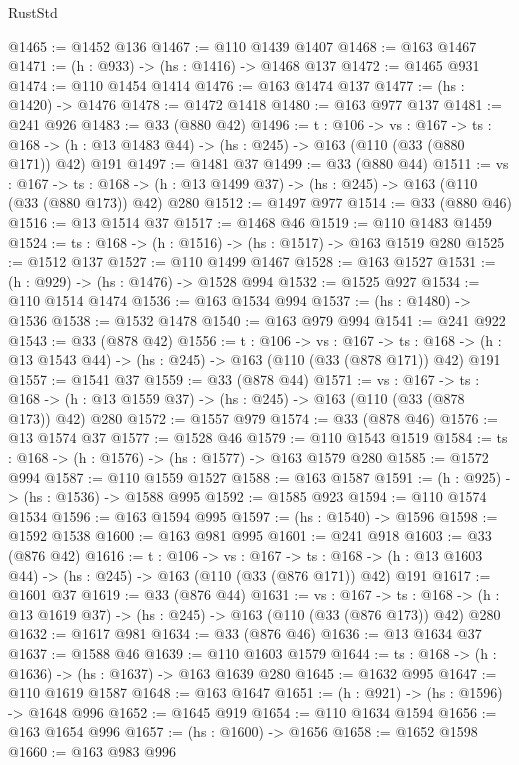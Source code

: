 \begin{lexlean}{RustStd}
\begin{coremodule}
{\begin{coremodule}
{{{{{@1465 := @1452 @136
@1467 := @110 @1439 @1407
@1468 := @163 @1467
@1471 := (h : @933) -> (hs : @1416) -> @1468 @137
@1472 := @1465 @931
@1474 := @110 @1454 @1414
@1476 := @163 @1474 @137
@1477 := (hs : @1420) -> @1476
@1478 := @1472 @1418
@1480 := @163 @977 @137
@1481 := @241 @926
@1483 := @33 (@880 @42)
@1496 := {t : @106} ->
  {vs : @167} ->
  {ts : @168} -> (h : @13 @1483 @44) -> (hs : @245) -> @163 (@110 (@33 (@880 @171)) @42) @191
@1497 := @1481 @37
@1499 := @33 (@880 @44)
@1511 := {vs : @167} ->
  {ts : @168} -> (h : @13 @1499 @37) -> (hs : @245) -> @163 (@110 (@33 (@880 @173)) @42) @280
@1512 := @1497 @977
@1514 := @33 (@880 @46)
@1516 := @13 @1514 @37
@1517 := @1468 @46
@1519 := @110 @1483 @1459
@1524 := {ts : @168} -> (h : @1516) -> (hs : @1517) -> @163 @1519 @280
@1525 := @1512 @137
@1527 := @110 @1499 @1467
@1528 := @163 @1527
@1531 := (h : @929) -> (hs : @1476) -> @1528 @994
@1532 := @1525 @927
@1534 := @110 @1514 @1474
@1536 := @163 @1534 @994
@1537 := (hs : @1480) -> @1536
@1538 := @1532 @1478
@1540 := @163 @979 @994
@1541 := @241 @922
@1543 := @33 (@878 @42)
@1556 := {t : @106} ->
  {vs : @167} ->
  {ts : @168} -> (h : @13 @1543 @44) -> (hs : @245) -> @163 (@110 (@33 (@878 @171)) @42) @191
@1557 := @1541 @37
@1559 := @33 (@878 @44)
@1571 := {vs : @167} ->
  {ts : @168} -> (h : @13 @1559 @37) -> (hs : @245) -> @163 (@110 (@33 (@878 @173)) @42) @280
@1572 := @1557 @979
@1574 := @33 (@878 @46)
@1576 := @13 @1574 @37
@1577 := @1528 @46
@1579 := @110 @1543 @1519
@1584 := {ts : @168} -> (h : @1576) -> (hs : @1577) -> @163 @1579 @280
@1585 := @1572 @994
@1587 := @110 @1559 @1527
@1588 := @163 @1587
@1591 := (h : @925) -> (hs : @1536) -> @1588 @995
@1592 := @1585 @923
@1594 := @110 @1574 @1534
@1596 := @163 @1594 @995
@1597 := (hs : @1540) -> @1596
@1598 := @1592 @1538
@1600 := @163 @981 @995
@1601 := @241 @918
@1603 := @33 (@876 @42)
@1616 := {t : @106} ->
  {vs : @167} ->
  {ts : @168} -> (h : @13 @1603 @44) -> (hs : @245) -> @163 (@110 (@33 (@876 @171)) @42) @191
@1617 := @1601 @37
@1619 := @33 (@876 @44)
@1631 := {vs : @167} ->
  {ts : @168} -> (h : @13 @1619 @37) -> (hs : @245) -> @163 (@110 (@33 (@876 @173)) @42) @280
@1632 := @1617 @981
@1634 := @33 (@876 @46)
@1636 := @13 @1634 @37
@1637 := @1588 @46
@1639 := @110 @1603 @1579
@1644 := {ts : @168} -> (h : @1636) -> (hs : @1637) -> @163 @1639 @280
@1645 := @1632 @995
@1647 := @110 @1619 @1587
@1648 := @163 @1647
@1651 := (h : @921) -> (hs : @1596) -> @1648 @996
@1652 := @1645 @919
@1654 := @110 @1634 @1594
@1656 := @163 @1654 @996
@1657 := (hs : @1600) -> @1656
@1658 := @1652 @1598
@1660 := @163 @983 @996
}}}}}
\end{coremodule}}
\end{coremodule}
\end{lexlean}
